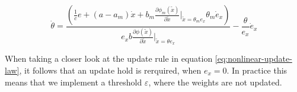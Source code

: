 


\begin{equation}
     \dot \theta = \frac{(\frac{1}{c} e + (a-a_m)\dot x + b_m\frac{\partial \phi_m(\tilde x)}{\partial \tilde x}\vert_{\tilde x=\theta_me_x}\theta_m \dot e_x) }{e_x b \frac{\partial \phi(\tilde x)}{\partial \tilde x}\vert_{\tilde x=\theta e_x}} - \frac{\theta}{e_x}\dot e_x
    \label{eq:nonlinear-update-law}
\end{equation}

When taking a closer look at the update rule in equation \eqref{eq:nonlinear-update-law}, it follows that an update hold is rerquired, when $e_x=0$. In practice this means that we implement a threshold $\varepsilon$, where the weights are not updated.

